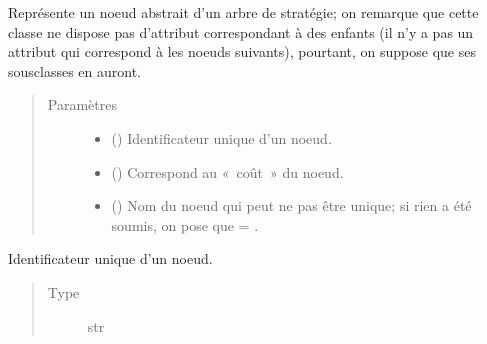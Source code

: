 \documentclass[letterpaper,10pt,french]{sphinxmanual}
\begin{document}
\begin{fulllineitems}
\label{\detokenize{index:StrategyTree.NodeST}}
Représente un noeud abstrait d’un arbre de stratégie; on remarque que cette
classe ne dispose pas d’attribut correspondant à des enfants (il n’y a pas
un attribut qui correspond à les noeuds suivants), pourtant, on suppose que
ses sous\sphinxhyphen{}classes en auront.
\begin{quote}\begin{description}
\item[{Paramètres}] \leavevmode\begin{itemize}
\item {} 
 () \textendash{} Identificateur unique d’un noeud.

\item {} 
 () \textendash{} Correspond au « coût » du noeud.

\item {} 
 (\sphinxstyleliteralemphasis{\sphinxupquote{, }}) \textendash{} Nom du noeud qui peut ne pas être unique; si rien a été soumis, on pose
que  = .

\end{itemize}

\end{description}\end{quote}

\begin{fulllineitems}
\label{\detokenize{index:StrategyTree.NodeST._id}}
Identificateur unique d’un noeud.
\begin{quote}\begin{description}
\item[{Type}] \leavevmode
str

\end{description}\end{quote}


\end{fulllineitems}
\end{fulllineitems}
\end{document}
